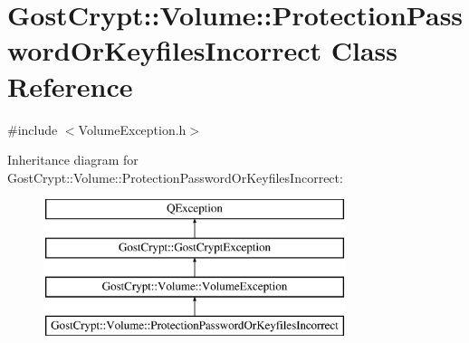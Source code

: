 \hypertarget{class_gost_crypt_1_1_volume_1_1_protection_password_or_keyfiles_incorrect}{}\section{Gost\+Crypt\+:\+:Volume\+:\+:Protection\+Password\+Or\+Keyfiles\+Incorrect Class Reference}
\label{class_gost_crypt_1_1_volume_1_1_protection_password_or_keyfiles_incorrect}


{\ttfamily \#include $<$Volume\+Exception.\+h$>$}

Inheritance diagram for Gost\+Crypt\+:\+:Volume\+:\+:Protection\+Password\+Or\+Keyfiles\+Incorrect\+:\begin{figure}[H]
\begin{center}
\leavevmode
\includegraphics[height=4.000000cm]{class_gost_crypt_1_1_volume_1_1_protection_password_or_keyfiles_incorrect}
\end{center}
\end{figure}
